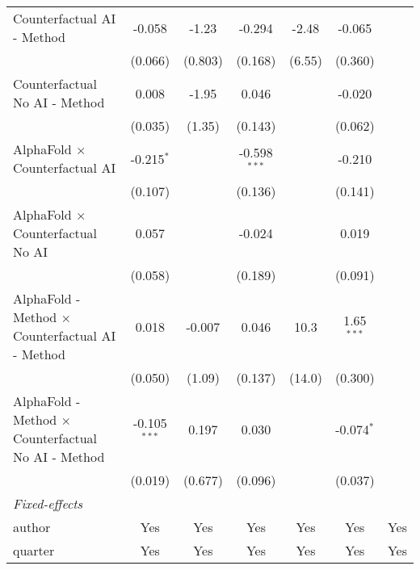 \begin{tabular}{lcccccc}
   Counterfactual AI - Method                                 & -0.058         & -1.23   & -0.294         & -2.48        & -0.065       &   \\   
                                                              & (0.066)        & (0.803) & (0.168)        & (6.55)       & (0.360)      &   \\   
   Counterfactual No AI - Method                              & 0.008          & -1.95   & 0.046          &              & -0.020       &   \\   
                                                              & (0.035)        & (1.35)  & (0.143)        &              & (0.062)      &   \\   
   AlphaFold $\times$ Counterfactual AI                       & -0.215$^{*}$   &         & -0.598$^{***}$ &              & -0.210       &   \\   
                                                              & (0.107)        &         & (0.136)        &              & (0.141)      &   \\   
   AlphaFold $\times$ Counterfactual No AI                    & 0.057          &         & -0.024         &              & 0.019        &   \\   
                                                              & (0.058)        &         & (0.189)        &              & (0.091)      &   \\   
   AlphaFold - Method $\times$ Counterfactual AI - Method     & 0.018          & -0.007  & 0.046          & 10.3         & 1.65$^{***}$ &   \\   
                                                              & (0.050)        & (1.09)  & (0.137)        & (14.0)       & (0.300)      &   \\   
   AlphaFold - Method $\times$ Counterfactual No AI - Method  & -0.105$^{***}$ & 0.197   & 0.030          &              & -0.074$^{*}$ &   \\   
                                                              & (0.019)        & (0.677) & (0.096)        &              & (0.037)      &   \\   
   \midrule
   \emph{Fixed-effects}\\
   author                                                     & Yes            & Yes     & Yes            & Yes          & Yes          & Yes\\  
   quarter                                                    & Yes            & Yes     & Yes            & Yes          & Yes          & Yes\\  

\end{tabular}
